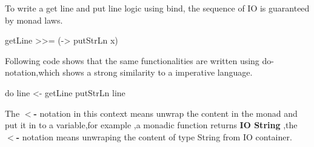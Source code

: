 To write a get line and put line logic using bind, the sequence of IO is guaranteed by monad laws.
\begin{hcode}
 getLine >>= (\x -> putStrLn x)
\end{hcode}


Following code shows that the same functionalities are written using do-notation,which shows a strong similarity to a imperative language.
\begin{hcode}
do line <- getLine 
   putStrLn line
\end{hcode}

The \textbf{$<$-} notation in this context means unwrap the content in the monad and put it in to a variable,for example ,a monadic function returns \textbf{IO String} ,the \textbf{$<$-} notation means unwraping the content of type String from IO container.

